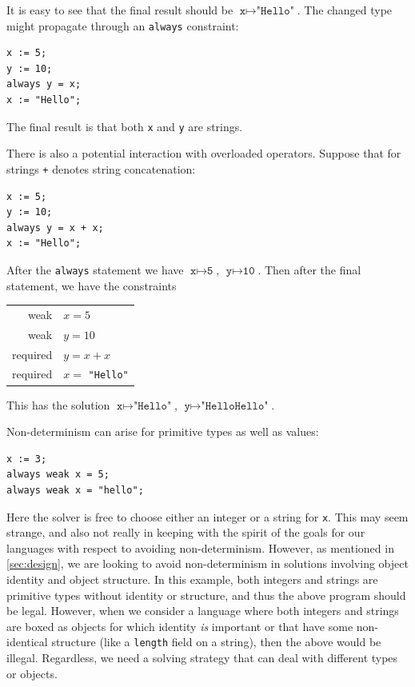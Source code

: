 It is easy to see that the final result should be
$\texttt{x} \mapsto \texttt{"Hello"}$. The changed type might
propagate through an \verb|always| constraint:
\begin{lstlisting}
x := 5;
y := 10;
always y = x;
x := "Hello";
\end{lstlisting}
The final result is that both \verb|x| and \verb|y| are strings.

There is also a potential interaction with overloaded operators.
Suppose that for strings \verb|+| denotes string concatenation:
\begin{lstlisting}
x := 5;
y := 10;
always y = x + x;
x := "Hello";
\end{lstlisting}
After the \verb|always| statement we have
$\texttt{x} \mapsto \texttt{5}$, $\texttt{y} \mapsto \texttt{10}$.
Then after the final statement, we have the constraints
\begin{center}
\begin{tabular}{rl}
weak     & $x=5$ \\
weak     & $y=10$ \\
required & $y=x+x$ \\
required & $x=$ \texttt{"Hello"}
\end{tabular}
\end{center}
This has the solution $\texttt{x} \mapsto \texttt{"Hello"}$, 
$\texttt{y} \mapsto \texttt{"HelloHello"}$.

Non-determinism can arise for primitive types as well as values:
\begin{lstlisting}
x := 3;
always weak x = 5;
always weak x = "hello";
\end{lstlisting}

Here the solver is free to choose either an integer or a string for
\verb|x|.  This may seem strange, and also not really in keeping with
the spirit of the goals for our languages with respect to avoiding
non-determinism. However, as mentioned in \autoref{sec:design}, we are
looking to avoid non-determinism in solutions involving object
identity and object structure. In this example, both integers and
strings are primitive types without identity or structure, and thus
the above program should be legal. However, when we consider a
language where both integers and strings are boxed as objects for
which identity \emph{is} important or that have some non-identical
structure (like a \verb!length! field on a string), then the above
would be illegal. Regardless, we need a solving strategy that can deal
with different types or objects.

